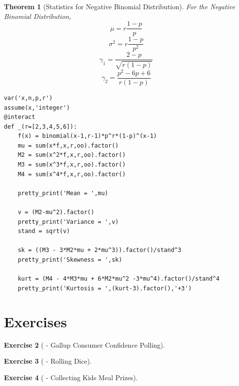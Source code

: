 \documentclass[10pt,]{book}
\theoremstyle{plain}
\newtheorem{theorem}{Theorem}[section]
\theoremstyle{definition}
\theoremstyle{definition}
\theoremstyle{definition}
\newtheorem{exercise}[theorem]{Exercise}
\numberwithin{equation}{section}
\begin{document}
\begin{theorem}[{Statistics for Negative Binomial Distribution}]\label{theorem-50}
For the Negative Binomial Distribution, 
		\begin{equation*}\mu = r \frac{1-p}{p}\end{equation*}\begin{equation*}\sigma^2 = r \frac{1-p}{p^2}\end{equation*}\begin{equation*}\gamma_1 = \frac{2-p}{\sqrt{r(1-p)}}\end{equation*}\begin{equation*}\gamma_2 = \frac{p^2-6p+6}{r(1-p)}\end{equation*}\begin{lstlisting}[style=sageinput]
var('x,n,p,r')
assume(x,'integer')
@interact
def _(r=[2,3,4,5,6]):
    f(x) = binomial(x-1,r-1)*p^r*(1-p)^(x-1)
    mu = sum(x*f,x,r,oo).factor()
    M2 = sum(x^2*f,x,r,oo).factor()
    M3 = sum(x^3*f,x,r,oo).factor()
    M4 = sum(x^4*f,x,r,oo).factor()
    
    pretty_print('Mean = ',mu)
    
    v = (M2-mu^2).factor()
    pretty_print('Variance = ',v)
    stand = sqrt(v)
    
    sk = ((M3 - 3*M2*mu + 2*mu^3)).factor()/stand^3
    pretty_print('Skewness = ',sk)
    
    kurt = (M4 - 4*M3*mu + 6*M2*mu^2 -3*mu^4).factor()/stand^4
    pretty_print('Kurtosis = ',(kurt-3).factor(),'+3')
\end{lstlisting}
\end{theorem}
\typeout{************************************************}
\typeout{************************************************}
\section[{Exercises}]{Exercises}\label{section-33}
\begin{exercise}[{ - Gallup Consumer Confidence Polling}]\label{exercise-12}
\end{exercise}
\begin{exercise}[{ - Rolling Dice}]\label{exercise-13}
\end{exercise}
\begin{exercise}[{ - Collecting Kids Meal Prizes}]\label{exercise-14}
\end{exercise}
\typeout{************************************************}
\typeout{************************************************}
\end{document}
